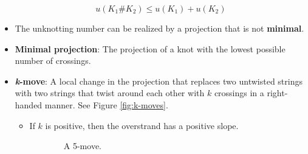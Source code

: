 \documentclass[titlepage]{article}
\numberwithin{figure}{section}
\numberwithin{table}{section}
\numberwithin{equation}{section}
\begin{document}
\begin{itemize}
\begin{itemize}
    \end{itemize}
    \begin{equation}
        u(K_1\#K_2)\leq u(K_1)+u(K_2)
    \end{equation}
    \item The unknotting number can be realized by a projection that is not \textbf{minimal}.
    \item \textbf{Minimal projection}: The projection of a knot with the lowest possible number of crossings.
    \item \textbf{\emph{k}-move}: A local change in the projection that replaces two untwisted strings with two strings that twist around each other with $k$ crossings in a right-handed manner. See Figure \ref{fig:k-moves}.
    \begin{itemize}
        \item If $k$ is positive, then the overstrand has a positive slope.
    \end{itemize}
    \begin{figure}[h!]
        \centering
        \begin{subfigure}[b]{0.2\linewidth}
            \centering
            \caption{A 5-move.}
            \label{fig:k-movesa}
        \end{subfigure}
        \begin{subfigure}[b]{0.2\linewidth}
            \centering

\end{subfigure}
\end{figure}
\end{itemize}
\end{document}

